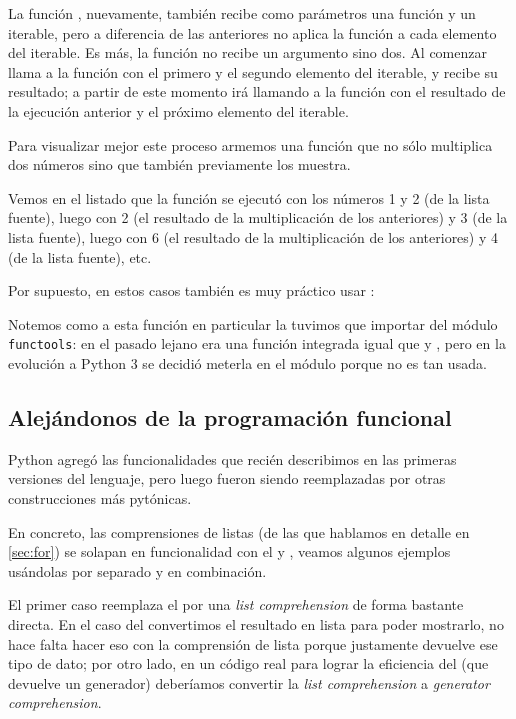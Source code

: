 
La función , nuevamente, también recibe como parámetros una función y un iterable, pero a diferencia de las anteriores no aplica la función a cada elemento del iterable. Es más, la función no recibe un argumento sino dos. Al comenzar  llama a la función con el primero y el segundo elemento del iterable, y recibe su resultado; a partir de este momento irá llamando a la función con el resultado de la ejecución anterior y el próximo elemento del iterable.

Para visualizar mejor este proceso armemos una función que no sólo multiplica dos números sino que también previamente los muestra.


Vemos en el listado que la función se ejecutó con los números 1 y 2 (de la lista fuente), luego con 2 (el resultado de la multiplicación de los anteriores) y 3 (de la lista fuente), luego con 6 (el resultado de la multiplicación de los anteriores) y 4 (de la lista fuente), etc.

Por supuesto, en estos casos también es muy práctico usar :


Notemos como a esta función en particular la tuvimos que importar del módulo \texttt{functools}: en el pasado lejano era una función integrada igual que  y , pero en la evolución a Python 3 se decidió meterla en el módulo porque no es tan usada.


\subsection{Alejándonos de la programación funcional}

Python agregó las funcionalidades que recién describimos en las primeras versiones del lenguaje, pero luego fueron siendo reemplazadas por otras construcciones más pytónicas. 

En concreto, las comprensiones de listas (de las que hablamos en detalle en \ref{sec:for}) se solapan en funcionalidad con el  y , veamos algunos ejemplos usándolas por separado y en combinación.

El primer caso reemplaza el  por una \textit{list comprehension} de forma bastante directa. En el caso del  convertimos el resultado en lista para poder mostrarlo, no hace falta hacer eso con la comprensión de lista porque justamente devuelve ese tipo de dato; por otro lado, en un código real para lograr la eficiencia del  (que devuelve un generador) deberíamos convertir la \textit{list comprehension} a \textit{generator comprehension}.

